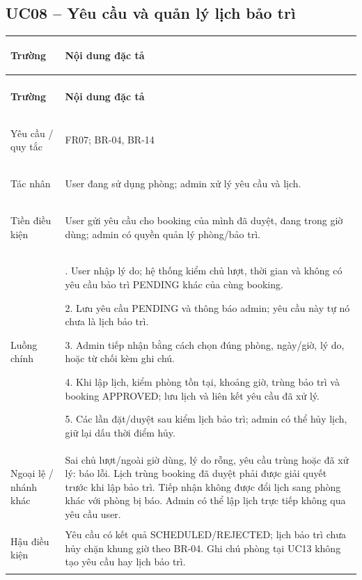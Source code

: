 \subsection{UC08 -- Yêu cầu và quản lý lịch bảo trì}\label{tab:uc08}
{\small\renewcommand{\arraystretch}{1.06}
\setlength{\tabcolsep}{6pt}\setlength{\extrarowheight}{2pt}
\renewcommand{\theHtable}{uc.\arabic{subsection}}\addtocounter{table}{-1}
\begin{longtable}{|>{\bfseries\raggedright\arraybackslash}p{3cm}|>{\raggedright\arraybackslash}p{\dimexpr\textwidth-3cm-4\tabcolsep-3\arrayrulewidth\relax}|}
\hline
\textbf{Trường} & \textbf{Nội dung đặc tả}\\\hline
\endfirsthead
\multicolumn{2}{r}{\small\itshape UC08 (tiếp)}\\
\hline
\textbf{Trường} & \textbf{Nội dung đặc tả}\\\hline
\endhead
\endlastfoot
Yêu cầu / quy tắc & FR07; BR-04, BR-14\\*\hline
Tác nhân & User đang sử dụng phòng; admin xử lý yêu cầu và lịch.\\*\hline
Tiền điều kiện & User gửi yêu cầu cho booking của mình đã duyệt, đang trong giờ dùng; admin có quyền quản lý phòng/bảo trì.\\*\hline
Luồng chính & 1. User nhập lý do; hệ thống kiểm chủ lượt, thời gian và không có yêu cầu bảo trì PENDING khác của cùng booking.\par
2. Lưu yêu cầu PENDING và thông báo admin; yêu cầu này tự nó chưa là lịch bảo trì.\par
3. Admin tiếp nhận bằng cách chọn đúng phòng, ngày/giờ, lý do, hoặc từ chối kèm ghi chú.\par
4. Khi lập lịch, kiểm phòng tồn tại, khoảng giờ, trùng bảo trì và booking APPROVED; lưu lịch và liên kết yêu cầu đã xử lý.\par
5. Các lần đặt/duyệt sau kiểm lịch bảo trì; admin có thể hủy lịch, giữ lại dấu thời điểm hủy.\\\hline
Ngoại lệ / nhánh khác & Sai chủ lượt/ngoài giờ dùng, lý do rỗng, yêu cầu trùng hoặc đã xử lý: báo lỗi. Lịch trùng booking đã duyệt phải được giải quyết trước khi lập bảo trì. Tiếp nhận không được đổi lịch sang phòng khác với phòng bị báo. Admin có thể lập lịch trực tiếp không qua yêu cầu user.\\\hline
Hậu điều kiện & Yêu cầu có kết quả SCHEDULED/REJECTED; lịch bảo trì chưa hủy chặn khung giờ theo BR-04. Ghi chú phòng tại UC13 không tạo yêu cầu hay lịch bảo trì.\\\hline
\end{longtable}}

